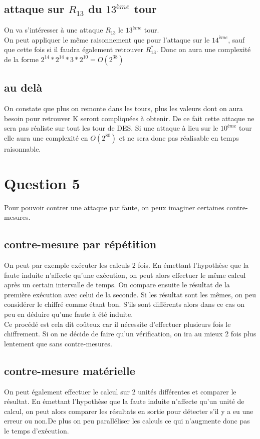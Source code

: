 \documentclass[a4paper,11pt]{article}
\begin{document}
	\subsection{attaque sur $R_{13}$ du $13^{ème}$ tour}
		On va s'intéresser à une attaque $R_{13}$ le $13^{ème}$ tour.\\
	On peut appliquer le même raisonnement que pour l'attaque sur le $14^{ème}$, sauf que cette fois si il faudra également retrouver $R_{13}^{*}$. Donc on aura une complexité de la forme $2^{14}*2^{14} * 3 * 2^{10} = O(2^{38})$
	
	\subsection{au delà}
	On constate que plus on remonte dans les tours, plus les valeurs dont on aura besoin pour retrouver K seront compliquées à obtenir. De ce fait cette attaque ne sera pas réaliste sur tout les tour de DES. Si une attaque à lieu sur le $10^{ème}$ tour elle aura une complexité en $O(2^{80})$ et ne sera donc pas réalisable en temps raisonnable.
	\section{Question 5}
		Pour pouvoir contrer une attaque par faute, on peux imaginer certaines contre-mesures.
		\subsection{contre-mesure par répétition} 
			On peut par exemple exécuter les calculs 2 fois. En émettant l'hypothèse que la faute induite n'affecte qu'une exécution, on peut alors effectuer le même calcul après un certain intervalle de temps. On compare ensuite le résultat de la première exécution avec celui de la seconde. Si les résultat sont les mêmes, on peu considérer le chiffré comme étant bon. S'ils sont différents alors dans ce cas on peu en déduire qu'une faute à été induite.\\
			Ce procédé est cela dit coûteux car il nécessite d'effectuer plusieurs fois le chiffrement. Si on ne décide de faire qu'un vérification, on ira au mieux 2 fois plus lentement que sans contre-mesures.   
		\subsection{contre-mesure matérielle}
			On peut également effectuer le calcul sur 2 unités différentes et comparer le résultat. En émettant l'hypothèse que la faute induite n'affecte qu'un unité de calcul, on peut alors comparer les résultats en sortie pour détecter s'il y a eu une erreur ou non.De plus on peu paralléliser les calculs ce qui n'augmente donc pas le temps d'exécution.   
\end{document}
